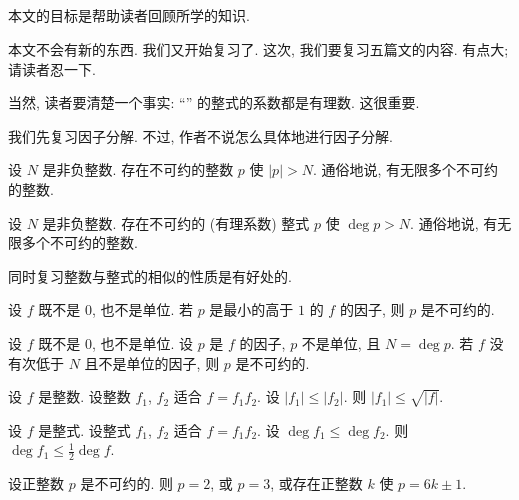 \subsection*{}

本文的目标是帮助读者回顾所学的知识.

本文不会有新的东西. 我们又开始复习了. 这次, 我们要复习五篇文的内容. 有点大; 请读者忍一下.

当然, 读者要清楚一个事实: ``'' 的整式的系数都是有理数. 这很重要.

我们先复习因子分解. 不过, 作者不说怎么具体地进行因子分解.

\begin{proposition}
    设 $N$ 是非负整数. 存在不可约的整数 $p$ 使 $|p| > N$. 通俗地说, 有无限多个不可约的整数.
\end{proposition}

\begin{proposition}
    设 $N$ 是非负整数. 存在不可约的 (有理系数) 整式 $p$ 使 $\deg p > N$. 通俗地说, 有无限多个不可约的整数.
\end{proposition}

\begin{remark}
    同时复习整数与整式的相似的性质是有好处的.
\end{remark}

\begin{proposition}
    设 $f$ 既不是 $0$, 也不是单位. 若 $p$ 是最小的高于 $1$ 的 $f$ 的因子, 则 $p$ 是不可约的.
\end{proposition}

\begin{proposition}
    设 $f$ 既不是 $0$, 也不是单位. 设 $p$ 是 $f$ 的因子, $p$ 不是单位, 且 $N = \deg p$. 若 $f$ 没有次低于 $N$ 且不是单位的因子, 则 $p$ 是不可约的.
\end{proposition}

\begin{proposition}
    设 $f$ 是整数. 设整数 $f_1$, $f_2$ 适合 $f = f_1 f_2$. 设 $|f_1| \leq |f_2|$. 则 $|f_1| \leq \sqrt{|f|}$.
\end{proposition}

\begin{proposition}
    设 $f$ 是整式. 设整式 $f_1$, $f_2$ 适合 $f = f_1 f_2$. 设 $\deg f_1 \leq \deg f_2$. 则 $\deg f_1 \leq \frac{1}{2} \deg f$.
\end{proposition}

\begin{proposition}
    设正整数 $p$ 是不可约的. 则 $p = 2$, 或 $p = 3$, 或存在正整数 $k$ 使 $p = 6k \pm 1$.
\end{proposition}

